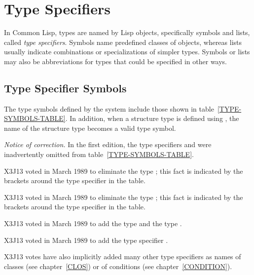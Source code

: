 
\clearpage\def\pagestatus{FINAL PROOF}

\chapter{Type Specif{\kern0pt}iers}    %
\label{DTSPEC}

In Common Lisp, types are named by Lisp objects, specifically symbols and lists,
called {\it type specifiers}.  Symbols name predefined classes of objects,
whereas lists usually indicate combinations or
specializations of simpler types.
Symbols or lists may also be abbreviations for types that could
be specified in other ways.

\section{Type Specifier Symbols}

The type symbols defined by the system include those shown in
table~\ref{TYPE-SYMBOLS-TABLE}.
In addition, when a structure type is defined using ,
the name of the structure type becomes a valid type symbol.

\begin{new}%
{\it Notice of correction.}
In the first edition, the type specifiers  and
 were inadvertently omitted from
table~\ref{TYPE-SYMBOLS-TABLE}.
\end{new}

\begin{newer}
X3J13 voted in March 1989 
to eliminate the type ; this fact is indicated by the brackets around
the  type specifier in the table.

X3J13 voted in March 1989 
to eliminate the type ;
this fact is indicated by the brackets around
the  type specifier in the table.

X3J13 voted in March 1989 
to add the type  and the type .

X3J13 voted in March 1989 
to add the type specifier .

X3J13 votes have also implicitly added
many other type specifiers as names of classes (see chapter~\ref{CLOS})
or of conditions (see chapter~\ref{CONDITION}).
\end{newer}

